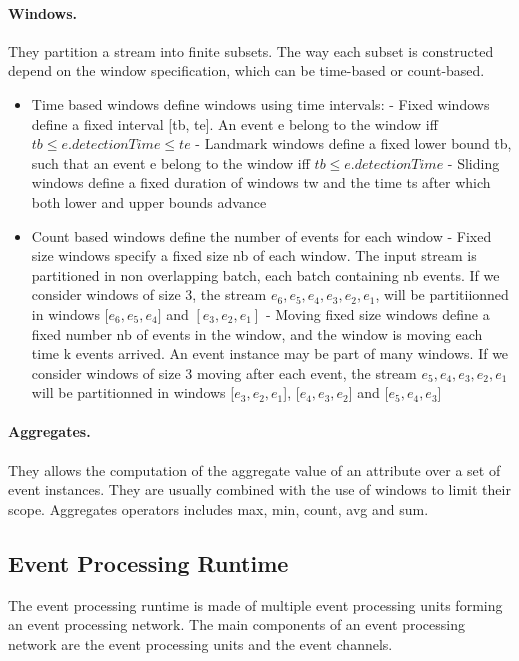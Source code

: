 \documentclass[a4paper,twoside]{article}
\begin{document}
\paragraph{Windows.} They partition a stream into finite subsets. The way each subset is constructed depend on the window specification, which can be time-based or count-based. 
\begin{itemize}
\item Time based windows define windows using time intervals:
\subitem - Fixed windows define a fixed interval [tb, te]. An event e belong to the window iff $ tb \leq e.detectionTime \leq te$
\subitem - Landmark windows define a fixed lower bound tb, such that an event e belong to the window iff $ tb \leq e.detectionTime $
\subitem - Sliding windows define a fixed duration of windows tw and the time ts after which both lower and upper bounds advance
\item Count based windows define the number of events for each window
\subitem - Fixed size windows specify a fixed size nb of each window. The input stream is partitioned in non overlapping batch, each batch containing nb events. If we consider windows of size 3, the stream $e_6, e_5,e_4, e_3, e_2, e_1$, will be partitiionned in windows [$e_6, e_5,e_4]$ and $[e_3, e_2, e_1]$
\subitem - Moving fixed size windows define a fixed number nb of events in the window, and the window is moving each time k events arrived. An event instance may be part of many windows. If we consider windows of size 3 moving after each event, the stream $e_5,e_4, e_3, e_2, e_1$ will be partitionned in windows [$e_3, e_2, e_1$], [$e_4,e_3, e_2$] and [$e_5, e_4,e_3$]
\end{itemize}

\paragraph{Aggregates.} They allows the computation of the aggregate value of an attribute over a set of event instances. They are usually combined with the use of windows to limit their scope. Aggregates operators includes max, min, count, avg and sum. 
\subsection{Event Processing Runtime}
The event processing runtime is made of multiple event processing units forming an event processing network. The main components of an event processing network are the event processing units and the event channels.
\end{document}
